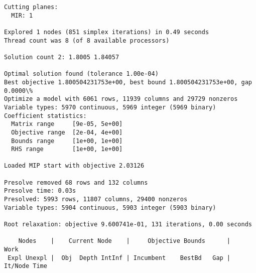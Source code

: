 \documentclass[11pt]{article}
\begin{document}
\begin{Verbatim}[commandchars=\\\{\}]
Cutting planes:
  MIR: 1

Explored 1 nodes (851 simplex iterations) in 0.49 seconds
Thread count was 8 (of 8 available processors)

Solution count 2: 1.8005 1.84057 

Optimal solution found (tolerance 1.00e-04)
Best objective 1.800504231753e+00, best bound 1.800504231753e+00, gap 0.0000\%
Optimize a model with 6061 rows, 11939 columns and 29729 nonzeros
Variable types: 5970 continuous, 5969 integer (5969 binary)
Coefficient statistics:
  Matrix range     [9e-05, 5e+00]
  Objective range  [2e-04, 4e+00]
  Bounds range     [1e+00, 1e+00]
  RHS range        [1e+00, 1e+00]

Loaded MIP start with objective 2.03126

Presolve removed 68 rows and 132 columns
Presolve time: 0.03s
Presolved: 5993 rows, 11807 columns, 29400 nonzeros
Variable types: 5904 continuous, 5903 integer (5903 binary)

Root relaxation: objective 9.600741e-01, 131 iterations, 0.00 seconds

    Nodes    |    Current Node    |     Objective Bounds      |     Work
 Expl Unexpl |  Obj  Depth IntInf | Incumbent    BestBd   Gap | It/Node Time


\end{Verbatim}
\end{document}
